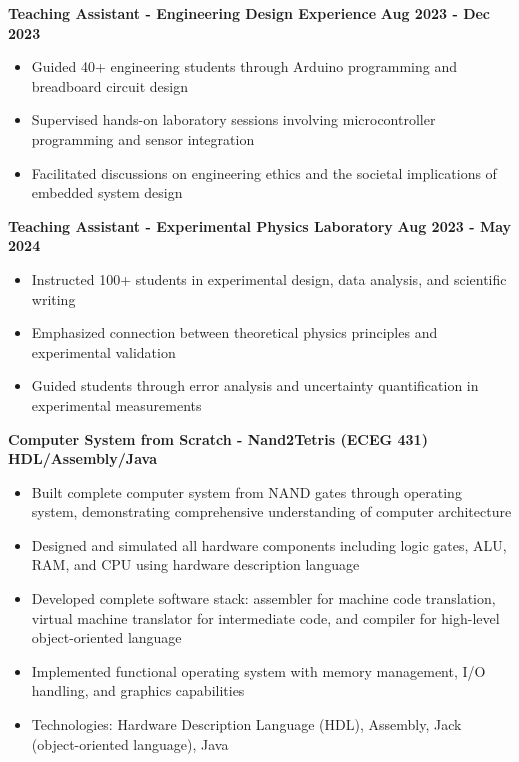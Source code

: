 \documentclass{article}
\begin{document}
 \hfill {}

\textbf{Teaching Assistant - Engineering Design Experience} \hfill \textbf{Aug 2023 - Dec 2023}
\begin{itemize}[noitemsep,topsep=2pt]
    \item Guided 40+ engineering students through Arduino programming and breadboard circuit design
    \item Supervised hands-on laboratory sessions involving microcontroller programming and sensor integration
    \item Facilitated discussions on engineering ethics and the societal implications of embedded system design
\end{itemize}

 \hfill {}

\textbf{Teaching Assistant - Experimental Physics Laboratory} \hfill \textbf{Aug 2023 - May 2024}
\begin{itemize}[noitemsep,topsep=2pt]
    \item Instructed 100+ students in experimental design, data analysis, and scientific writing
    \item Emphasized connection between theoretical physics principles and experimental validation
    \item Guided students through error analysis and uncertainty quantification in experimental measurements
\end{itemize}


\textbf{Computer System from Scratch - Nand2Tetris (ECEG 431)} \hfill \textbf{HDL/Assembly/Java}
\begin{itemize}[noitemsep,topsep=2pt]
    \item Built complete computer system from NAND gates through operating system, demonstrating comprehensive understanding of computer architecture
    \item Designed and simulated all hardware components including logic gates, ALU, RAM, and CPU using hardware description language
    \item Developed complete software stack: assembler for machine code translation, virtual machine translator for intermediate code, and compiler for high-level object-oriented language
    \item Implemented functional operating system with memory management, I/O handling, and graphics capabilities
    \item Technologies: Hardware Description Language (HDL), Assembly, Jack (object-oriented language), Java
\end{itemize}
\end{document}
